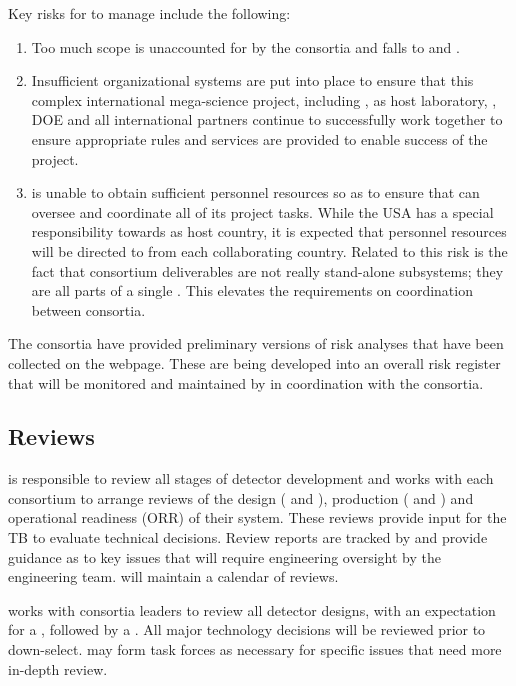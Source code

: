 Key risks for  to manage include the following:
\begin{enumerate}
    \item Too much scope is unaccounted for by the consortia and falls
      to  and .
    \item Insufficient organizational systems are put into place to
      ensure that this complex international mega-science project,
      including , \fnal as host laboratory, \surf, DOE and all international
      partners continue to successfully work together to ensure
      appropriate rules and services are provided to enable success of
      the project.
  \item {} is unable to obtain sufficient personnel resources so as to
    ensure that  can oversee and coordinate all of its
    project tasks.  While the USA has a special responsibility towards
     as host country, it is expected that personnel resources will
    be directed to  from each collaborating country. Related to this
    risk is the fact that consortium deliverables are not really
    stand-alone subsystems; they are all parts of a single . This
    elevates the requirements on coordination between consortia.
\end{enumerate}

The consortia have provided preliminary versions of risk analyses that
have been collected on the  webpage. These are being developed into
an overall risk register that will be monitored and maintained by 
in coordination with the consortia.

\subsection{Reviews}
\label{sec:fdsp-coord-reviews}

 is responsible to review all stages of detector development
and works with each consortium to arrange reviews of the design
( and ), production ( and
) and operational readiness (ORR) of their system.  These
reviews provide input for the TB to evaluate technical decisions.
Review reports are tracked by  and provide guidance as to
key issues that will require engineering oversight by the 
engineering team.  will maintain a calendar of 
reviews.

 works with consortia leaders to review all detector designs,
with an expectation for a , followed by a .  All
major technology decisions will be reviewed prior to down-select.  
may form task forces as necessary for specific issues that need more
in-depth review.


